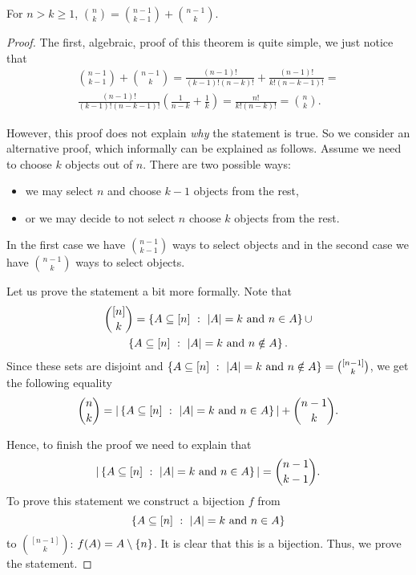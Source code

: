 \begin{theorem}
  For $n > k \ge 1$, $\binom{n}{k} = \binom{n - 1}{k - 1} + \binom{n - 1}{k}$.
\end{theorem}
\begin{proof}
  The first, algebraic, proof of this theorem is quite simple, we just notice
  that
  \begin{multline*}
    \binom{n - 1}{k - 1} + \binom{n - 1}{k} =
      \frac{(n - 1)!}{(k - 1)!(n - k)!} + \frac{(n - 1)!}{k!(n - k - 1)!} = \\
      \frac{(n - 1)!}{(k - 1)! (n - k - 1)!}
        \left(
          \frac{1}{n - k} + \frac{1}{k}
        \right) = \frac{n!}{k! (n - k)!} = \binom{n}{k}.
  \end{multline*}

  However, this proof does not explain \emph{why} the statement is true.
  So we consider an alternative proof, which informally can be explained as
  follows. Assume we need to choose $k$ objects out of $n$. There are two
  possible ways:
  \begin{itemize}
    \item we may select $n$ and choose $k - 1$ objects from the rest,
    \item or we may decide to not select $n$ choose $k$ objects from the rest.
  \end{itemize}
  In the first case we have $\binom{n - 1}{k - 1}$ ways to select objects and
  in the second case we have $\binom{n - 1}{k}$ ways to select objects.

  Let us prove the statement a bit more formally. Note that
  \begin{multline*}
    \binom{[n]}{k} = \set[|A| = k \text{ and } n \in A]{A \subseteq [n]} \cup \\
    \set[|A| = k \text{ and } n \notin A]{A \subseteq [n]}.
  \end{multline*}
  Since these sets are disjoint and $\set[|A| = k \text{ and } n \notin A]{A
  \subseteq [n]} = \binom{[n - 1]}{k}$, we get the following equality
  \[
    \binom{n}{k} = |\set[|A| = k \text{ and } n \in A]{A \subseteq [n]}| +
    \binom{n - 1}{k}.
  \]

  Hence, to finish the proof we need to explain that
  \[
    |\set[|A| = k \text{ and } n \in A]{A \subseteq [n]}| =
    \binom{n - 1}{k - 1}.
  \]
  To prove this statement we construct a bijection $f$
  from \[
    \set[|A| = k \text{ and } n \in A]{A \subseteq [n]}
  \] to
  $\binom{[n - 1]}{k}$: $f(A) = A \setminus \set{n}$.
  It is clear that this is a bijection. Thus, we prove the statement.
\end{proof}


